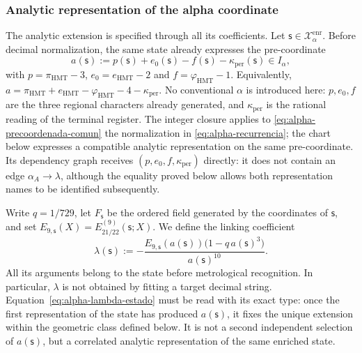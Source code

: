 \subsubsection{Analytic representation of the alpha coordinate}
\label{subsec:alpha-lector-completo-rev08}

The analytic extension is specified through all its coefficients.
Let \(\mathsf s\in\mathcal X_\alpha^{\mathrm{enr}}\). Before
decimal normalization, the same state already expresses the pre-coordinate
\begin{equation}
 a(\mathsf s):=p(\mathsf s)+e_0(\mathsf s)-f(\mathsf s)
                 -\kappa_{\mathrm{per}}(\mathsf s)\in I_\alpha,
 \label{eq:alpha-precoordenada-comun}
\end{equation}
with \(p=\pi_{\mathrm{HMT}}-3\),
\(e_0=e_{\mathrm{HMT}}-2\) and
\(f=\varphi_{\mathrm{HMT}}-1\). Equivalently,
\(a=\pi_{\mathrm{HMT}}+e_{\mathrm{HMT}}-
\varphi_{\mathrm{HMT}}-4-\kappa_{\mathrm{per}}\). No conventional
\(\alpha\) is introduced here: \(p,e_0,f\) are the three regional characters already
generated, and \(\kappa_{\mathrm{per}}\) is the rational reading of the terminal
register. The integer closure applies to
\eqref{eq:alpha-precoordenada-comun} the normalization in
\eqref{eq:alpha-recurrencia}; the chart below expresses a compatible
analytic representation on the same pre-coordinate. Its dependency
graph receives \((p,e_0,f,\kappa_{\mathrm{per}})\) directly: it does not
contain an edge \(\alpha_A\to\lambda\), although the equality proved below
allows both representation names to be identified subsequently.

Write \(q=1/729\), let \(F_{\mathsf s}\) be the ordered field generated by
the coordinates of \(\mathsf s\), and set
\(E_{9,\mathsf s}(X)=E_{21/22}^{(9)}(\mathsf s;X)\). We define the linking
coefficient
\begin{equation}
 \lambda(\mathsf s):=
 -\frac{E_{9,\mathsf s}(a(\mathsf s))
         \bigl(1-q\,a(\mathsf s)^3\bigr)}{a(\mathsf s)^{10}}.
 \label{eq:alpha-lambda-estado}
\end{equation}
All its arguments belong to the state before metrological
recognition. In particular, \(\lambda\) is not obtained by fitting a target
decimal string. Equation~\eqref{eq:alpha-lambda-estado} must be read with
its exact type: once the first representation of the state has produced
\(a(\mathsf s)\), it fixes the unique extension within the geometric class
defined below. It is not a second independent selection of
\(a(\mathsf s)\), but a correlated analytic representation of the same
enriched state.

